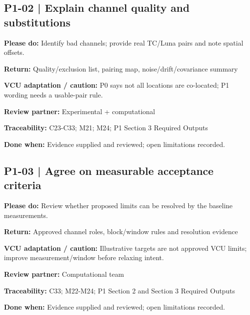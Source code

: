 \documentclass[11pt]{article}
\begin{document}
\begin{minipage}{\textwidth}\small\setlength{\parskip}{2pt}
\subsection*{P1-02 | Explain channel quality and substitutions}
\textbf{Please do:} Identify bad channels; provide real TC/Luna pairs and note spatial offsets.\par
\textbf{Return:} Quality/exclusion list, pairing map, noise/drift/covariance summary\par
\textbf{VCU adaptation / caution:} P0 says not all locations are co-located; P1 wording needs a usable-pair rule.\par
\textbf{Review partner:} Experimental + computational\par
\textbf{Traceability:} C23-C33; M21; M24; P1 Section 3 Required Outputs\par
\textbf{Done when:} Evidence supplied and reviewed; open limitations recorded.\par
\end{minipage}\par\vspace{8pt}
\begin{minipage}{\textwidth}\small\setlength{\parskip}{2pt}
\subsection*{P1-03 | Agree on measurable acceptance criteria}
\textbf{Please do:} Review whether proposed limits can be resolved by the baseline measurements.\par
\textbf{Return:} Approved channel roles, block/window rules and resolution evidence\par
\textbf{VCU adaptation / caution:} Illustrative targets are not approved VCU limits; improve measurement/window before relaxing intent.\par
\textbf{Review partner:} Computational team\par
\textbf{Traceability:} C33; M22-M24; P1 Section 2 and Section 3 Required Outputs\par
\textbf{Done when:} Evidence supplied and reviewed; open limitations recorded.\par
\end{minipage}\par\vspace{8pt}
\end{document}
